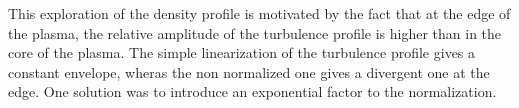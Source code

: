 \documentclass[11pt,a4paper]{report}
\begin{document}
\begin{multicols}{2}




    This exploration of the density profile is motivated by the fact that at the edge of the plasma, the relative amplitude of the turbulence profile is higher than in the core of the plasma.
    The simple linearization of the turbulence profile gives a constant envelope, wheras the non normalized one gives a divergent one at the edge. One solution was to introduce an exponential factor to the normalization.


\end{multicols}
\end{document}
